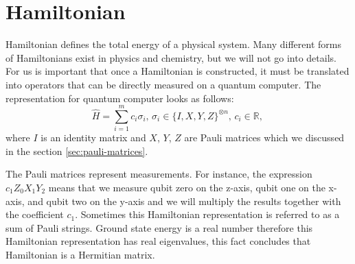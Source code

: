 \section{Hamiltonian}
Hamiltonian defines the total energy of a physical system. Many different forms of Hamiltonians exist in physics and chemistry, but we will not go into details. For us is important that once a Hamiltonian is constructed, it must be translated into operators that can be directly measured on a quantum computer. The representation for quantum computer looks as follows:
$$\hat{H} = \sum_{i=1}^{m}c_i\sigma_i \text{, } \sigma_i \in \{I, X, Y, Z\}^{\otimes n}\text{, } c_i \in \mathbb{R} \text{, }$$ 
where $I$ is an identity matrix and $X$, $Y$, $Z$ are Pauli matrices which we discussed in the section \ref{sec:pauli-matrices}.~\cite{fedorov2021vqe}

The Pauli matrices represent measurements. For instance, the expression $c_{1}Z_{0}X_{1}Y_{2}$ means that we measure qubit zero on the z-axis, qubit one on the x-axis, and qubit two on the y-axis and we will multiply the results together with the coefficient $c_{1}$. Sometimes this Hamiltonian representation is referred to as a sum of Pauli strings. Ground state energy is a real number therefore this Hamiltonian representation has real eigenvalues, this fact concludes that Hamiltonian is a Hermitian matrix. 